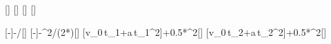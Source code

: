[\mps]
[\mpss]
[\s]
[\s]

[-]{-\vKaX/\aKX}[\s]
[-]{-\vKaX^2/(2*\aKX)}[\m]
[v_0\,t_1+a\,t_1^2]{\vKaX*\tKaX+0.5*\aKX*\tKaX^2}[\m]
[v_0\,t_2+a\,t_2^2]{\vKaX*\tKbX+0.5*\aKX*\tKbX^2}[\m]
